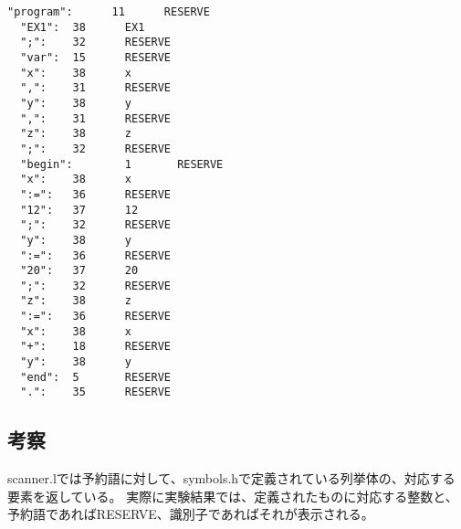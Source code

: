 \begin{lstlisting}[caption={./scanner ex1.pの実行結果},label={./scanner ex1.pの実行結果}]
  "program":      11      RESERVE
  "EX1":  38      EX1
  ";":    32      RESERVE
  "var":  15      RESERVE
  "x":    38      x
  ",":    31      RESERVE
  "y":    38      y
  ",":    31      RESERVE
  "z":    38      z
  ";":    32      RESERVE
  "begin":        1       RESERVE
  "x":    38      x
  ":=":   36      RESERVE
  "12":   37      12
  ";":    32      RESERVE
  "y":    38      y
  ":=":   36      RESERVE
  "20":   37      20
  ";":    32      RESERVE
  "z":    38      z
  ":=":   36      RESERVE
  "x":    38      x
  "+":    18      RESERVE
  "y":    38      y
  "end":  5       RESERVE
  ".":    35      RESERVE
\end{lstlisting}

\subsection{考察}
scanner.lでは予約語に対して、symbols.hで定義されている列挙体の、対応する要素を返している。
実際に実験結果では、定義されたものに対応する整数と、予約語であればRESERVE、識別子であればそれが表示される。
